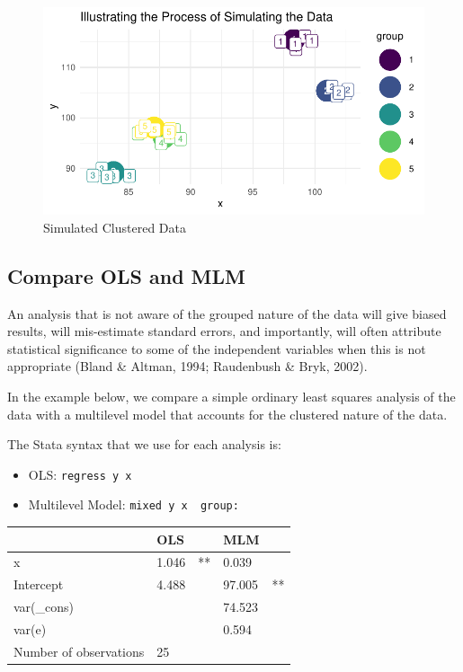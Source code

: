 \documentclass[
  letterpaper,
  DIV=11,
  numbers=noendperiod]{scrreprt}
\providecommand{\tightlist}{%
  \setlength{\itemsep}{0pt}\setlength{\parskip}{0pt}}\usepackage{longtable,booktabs,array}
\begin{document}
\begin{figure}

{\centering \includegraphics{./cross-sectional_files/figure-pdf/fig-simulatedclustereddata-1.pdf}

}

\caption{\label{fig-simulatedclustereddata}Simulated Clustered Data}

\end{figure}

\hypertarget{compare-ols-and-mlm}{%
\subsection{Compare OLS and MLM}\label{compare-ols-and-mlm}}

An analysis that is not aware of the grouped nature of the data will
give biased results, will mis-estimate standard errors, and importantly,
will often attribute statistical significance to some of the independent
variables when this is not appropriate (Bland \& Altman, 1994;
Raudenbush \& Bryk, 2002).

In the example below, we compare a simple ordinary least squares
analysis of the data with a multilevel model that accounts for the
clustered nature of the data.

The Stata syntax that we use for each analysis is:

\begin{itemize}
\tightlist
\item
  OLS: \texttt{regress\ y\ x}
\item
  Multilevel Model: \texttt{mixed\ y\ x\ \textbar{}\textbar{}\ group:}
\end{itemize}

\begin{longtable}[]{@{}lllll@{}}
\toprule()
& OLS & & MLM & \\
\midrule()
\endhead
x & 1.046 & ** & 0.039 & \\
Intercept & 4.488 & & 97.005 & ** \\
var(\_cons) & & & 74.523 & \\
var(e) & & & 0.594 & \\
Number of observations & 25 & & & \\
\bottomrule()
\end{longtable}
\end{document}
